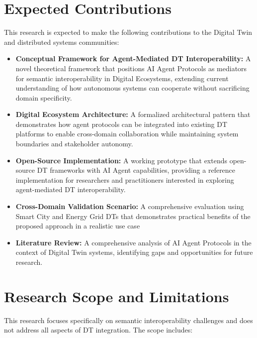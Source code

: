 \section{Expected Contributions}
\label{sec:contributions}

This research is expected to make the following contributions to the Digital Twin and distributed systems communities:

\begin{itemize}
    \item \textbf{Conceptual Framework for Agent-Mediated DT Interoperability:}
    A novel theoretical framework that positions AI Agent Protocols as mediators for semantic interoperability in Digital Ecosystems,
      extending current understanding of how autonomous systems can cooperate without sacrificing domain specificity.

    \item \textbf{Digital Ecosystem Architecture:}
    A formalized architectural pattern that demonstrates how agent protocols can be integrated into existing DT platforms
      to enable cross-domain collaboration while maintaining system boundaries and stakeholder autonomy.

    \item \textbf{Open-Source Implementation:}
    A working prototype that extends open-source DT frameworks with AI Agent capabilities,
      providing a reference implementation for researchers and practitioners interested in exploring agent-mediated DT interoperability.

    \item \textbf{Cross-Domain Validation Scenario:}
    A comprehensive evaluation using Smart City and Energy Grid DTs that demonstrates practical benefits of the proposed approach in a realistic use case

    \item \textbf{Literature Review:} A comprehensive analysis of AI Agent Protocols in the context of Digital Twin systems,
      identifying gaps and opportunities for future research.
\end{itemize}

\section{Research Scope and Limitations}
\label{sec:scope-limitations}

This research focuses specifically on semantic interoperability challenges and does not address all aspects of DT integration. The scope includes:

